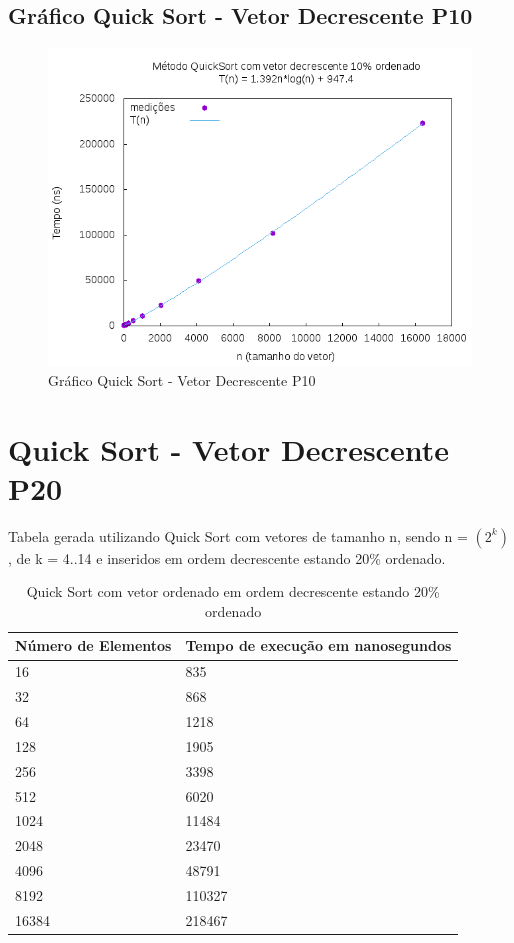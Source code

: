 \documentclass[12pt,a4paper,twoside]{report}
\begin{document}
\subsection{Gráfico Quick Sort - Vetor Decrescente P10}
\begin{figure}[H]
    \centering
    \includegraphics[width=0.7\linewidth]{graficos/QuickSort/vIntDecrescenteP10/vIntDecrescenteP10.png}
  \caption{Gráfico Quick Sort - Vetor Decrescente P10}
\end{figure}

\section{Quick Sort - Vetor Decrescente P20}
Tabela gerada utilizando Quick Sort com vetores de tamanho n, sendo n = $(2^k)$, de k = 4..14 e inseridos em ordem decrescente estando 20\% ordenado.
\begin{table}[H]
\centering
\caption{Quick Sort com vetor ordenado em ordem decrescente estando 20\% ordenado}
\label{my-label}
\begin{tabular}{|l|l|}
\hline
\multicolumn{1}{|c|}{\textbf{Número de Elementos}} & \multicolumn{1}{c|}{\textbf{Tempo de execução em nanosegundos}} \\ \hline
16 & 835 \\ \hline
32 & 868 \\ \hline
64 & 1218 \\ \hline
128 & 1905 \\ \hline
256 & 3398 \\ \hline
512 & 6020 \\ \hline
1024 & 11484 \\ \hline
2048 & 23470 \\ \hline
4096 & 48791 \\ \hline
8192 & 110327 \\ \hline
16384 & 218467 \\ \hline
\end{tabular}
\end{table}
\end{document}
